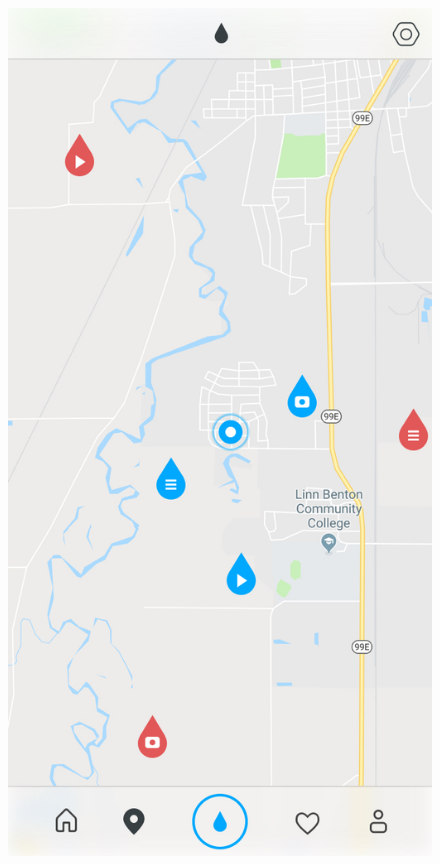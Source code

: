 \documentclass[draftclsnofoot, onecolumn, letterpaper,10pt,compsoc]{IEEEtran}
\begin{document}
\begin{figure}[H]
    \includegraphics[scale=.25]{maps.jpg}

\end{figure}
\end{document}

